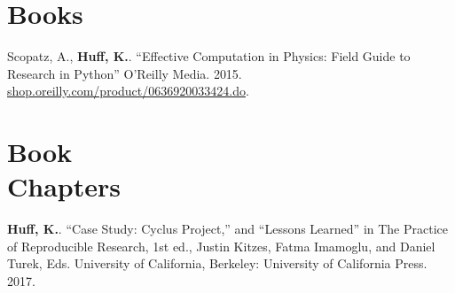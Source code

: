 \documentclass[margin,line]{resume}
\begin{document}
\begin{resume}
    \section{\mysidestyle Books}
      \begin{bibenum}
      \item Scopatz, A., \textbf{Huff, K.}. ``Effective Computation in
      Physics: Field Guide to Research in Python'' O'Reilly Media. 2015.
      \url{shop.oreilly.com/product/0636920033424.do}.
      \end{bibenum}
    \section{\mysidestyle Book\\Chapters}
      \begin{bibenum} 
      \item \textbf{Huff, K.}. ``Case Study: Cyclus Project,'' and ``Lessons 
              Learned'' in The Practice 
              of Reproducible Research, 1st ed., Justin Kitzes, Fatma Imamoglu, 
              and Daniel Turek, Eds. University of California, Berkeley: 
              University of California Press. 2017.
      \end{bibenum}

\end{resume}
\end{document}
